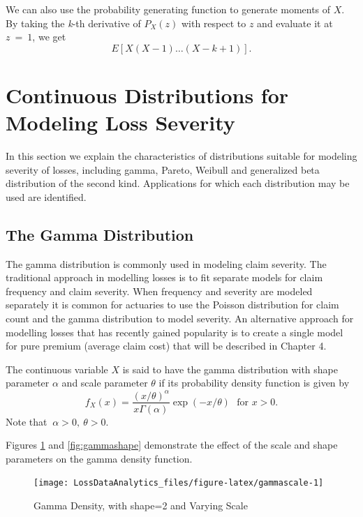 \documentclass[]{book}
\begin{document}
We can also use the probability generating function to generate moments
of \(X\). By taking the \emph{k}-th derivative of
\(P_{X}\left( z \right)\) with respect to \(z\) and evaluate it at
\(z\  = \ 1\), we get
\[E\left\lbrack X\left( X - 1 \right)\ldots\left( X - k + 1 \right) \right\rbrack .\]

\section{Continuous Distributions for Modeling Loss
Severity}\label{ContinuousDistn}

In this section we explain the characteristics of distributions suitable
for modeling severity of losses, including gamma, Pareto, Weibull and
generalized beta distribution of the second kind. Applications for which
each distribution may be used are identified.

\subsection{The Gamma Distribution}\label{the-gamma-distribution}

The gamma distribution is commonly used in modeling claim severity. The
traditional approach in modelling losses is to fit separate models for
claim frequency and claim severity. When frequency and severity are
modeled separately it is common for actuaries to use the Poisson
distribution for claim count and the gamma distribution to model
severity. An alternative approach for modelling losses that has recently
gained popularity is to create a single model for pure premium (average
claim cost) that will be described in Chapter 4.

The continuous variable \(X\) is said to have the gamma distribution
with shape parameter \(\alpha\) and scale parameter \(\theta\) if its
probability density function is given by
\[f_{X}\left( x \right) = \frac{\left( x/ \theta  \right)^{\alpha}}{x\Gamma\left( \alpha \right)}\exp \left( -x/ \theta \right) \ \ \ \text{for } x > 0 .\]
Note that \(\ \alpha > 0,\ \theta > 0\).

Figures \ref{fig:gammascale} and \ref{fig:gammashape} demonstrate the
effect of the scale and shape parameters on the gamma density function.

\begin{figure}

{\centering \texttt{[image: LossDataAnalytics\_files/figure-latex/gammascale-1]} 

}

\caption{Gamma Density, with shape=2 and Varying Scale}\label{fig:gammascale}
\end{figure}
\end{document}

